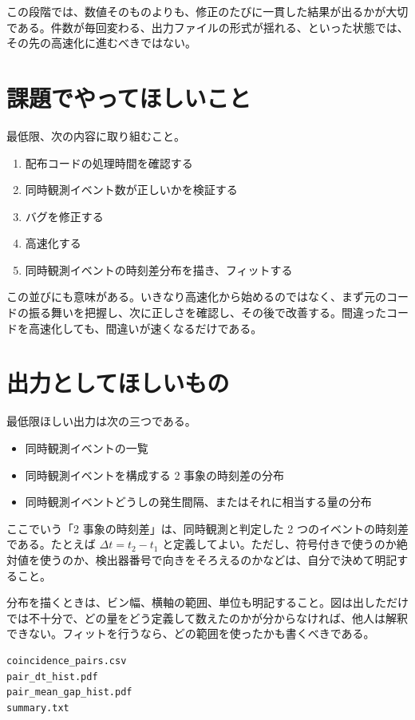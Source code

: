 この段階では、数値そのものよりも、修正のたびに一貫した結果が出るかが大切である。件数が毎回変わる、出力ファイルの形式が揺れる、といった状態では、その先の高速化に進むべきではない。

\section{課題でやってほしいこと}

最低限、次の内容に取り組むこと。

\begin{enumerate}
\item 配布コードの処理時間を確認する
\item 同時観測イベント数が正しいかを検証する
\item バグを修正する
\item 高速化する
\item 同時観測イベントの時刻差分布を描き、フィットする
\end{enumerate}

この並びにも意味がある。いきなり高速化から始めるのではなく、まず元のコードの振る舞いを把握し、次に正しさを確認し、その後で改善する。間違ったコードを高速化しても、間違いが速くなるだけである。

\section{出力としてほしいもの}

最低限ほしい出力は次の三つである。

\begin{itemize}
\item 同時観測イベントの一覧
\item 同時観測イベントを構成する 2 事象の時刻差の分布
\item 同時観測イベントどうしの発生間隔、またはそれに相当する量の分布
\end{itemize}

ここでいう「2 事象の時刻差」は、同時観測と判定した 2 つのイベントの時刻差である。たとえば $\Delta t = t_2 - t_1$ と定義してよい。ただし、符号付きで使うのか絶対値を使うのか、検出器番号で向きをそろえるのかなどは、自分で決めて明記すること。

分布を描くときは、ビン幅、横軸の範囲、単位も明記すること。図は出しただけでは不十分で、どの量をどう定義して数えたのかが分からなければ、他人は解釈できない。フィットを行うなら、どの範囲を使ったかも書くべきである。

\begin{lstlisting}[numbers=none, xleftmargin=2\zw, caption={出力ファイル名の例}]
coincidence_pairs.csv
pair_dt_hist.pdf
pair_mean_gap_hist.pdf
summary.txt
\end{lstlisting}

